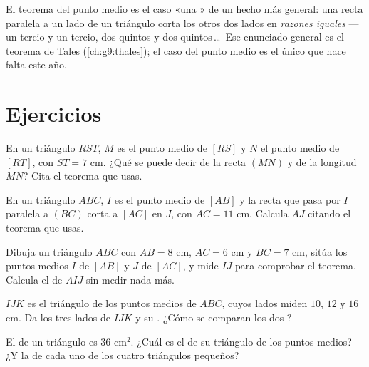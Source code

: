 \begin{remark}
El teorema del punto medio es el caso «una » de un hecho más general:
una recta paralela a un lado de un triángulo corta los otros dos lados en
\emph{razones iguales} --- un tercio y un tercio, dos quintos y dos
quintos\,\dots\ Ese enunciado general es el teorema de Tales
(\cref{ch:g9:thales}); el caso del punto medio es el único que hace falta este
año.
\end{remark}

\section{Ejercicios}

\begin{exercise}[$\star$]\label{exo:g8:midpoints:1}
En un triángulo $RST$, $M$ es el punto medio de $[RS]$ y $N$ el
punto medio de $[RT]$, con $ST = 7$ cm. ¿Qué se puede decir de la recta
$(MN)$ y de la longitud $MN$? Cita el teorema que usas.
\end{exercise}

\begin{exercise}[$\star$]\label{exo:g8:midpoints:2}
En un triángulo $ABC$, $I$ es el punto medio de $[AB]$ y la recta
que pasa por $I$ paralela a $(BC)$ corta a $[AC]$ en $J$, con
$AC = 11$ cm. Calcula $AJ$ citando el teorema que usas.
\end{exercise}

\begin{exercise}[$\star$]\label{exo:g8:midpoints:3}
Dibuja un triángulo $ABC$ con $AB = 8$ cm, $AC = 6$ cm y $BC = 7$ cm,
sitúa los puntos medios $I$ de $[AB]$ y $J$ de $[AC]$, y mide $IJ$
para comprobar el teorema. Calcula el  de $AIJ$ sin
medir nada más.
\end{exercise}

\begin{exercise}[$\star$]\label{exo:g8:midpoints:4}
$IJK$ es el triángulo de los puntos medios de $ABC$, cuyos lados miden $10$,
$12$ y $16$ cm. Da los tres lados de $IJK$ y su .
¿Cómo se comparan los dos ?
\end{exercise}

\begin{exercise}[$\star$]\label{exo:g8:midpoints:5}
El  de un triángulo es $36$ cm$^2$. ¿Cuál es el  de su
triángulo de los puntos medios? ¿Y la de cada uno de los cuatro triángulos pequeños?
\end{exercise}

